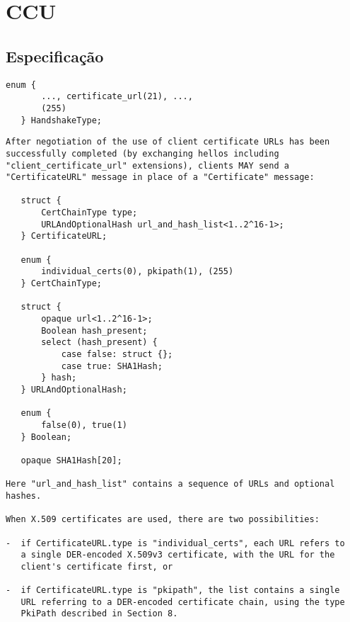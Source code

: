 
\section{\acl{CCU}}

\subsection{Especificação}

\begin{lstlisting}[caption={Definição do novo tipo de mensagem de \emph{handshake} \tlsHsCu}]
   enum {
       ..., certificate_url(21), ...,
       (255)
   } HandshakeType;
\end{lstlisting}

\begin{lstlisting}[caption={RFC 3546, trecho da seção 3.3}]
After negotiation of the use of client certificate URLs has been
successfully completed (by exchanging hellos including
"client_certificate_url" extensions), clients MAY send a
"CertificateURL" message in place of a "Certificate" message:

   struct {
       CertChainType type;
       URLAndOptionalHash url_and_hash_list<1..2^16-1>;
   } CertificateURL;

   enum {
       individual_certs(0), pkipath(1), (255)
   } CertChainType;

   struct {
       opaque url<1..2^16-1>;
       Boolean hash_present;
       select (hash_present) {
           case false: struct {};
           case true: SHA1Hash;
       } hash;
   } URLAndOptionalHash;

   enum {
       false(0), true(1)
   } Boolean;

   opaque SHA1Hash[20];

Here "url_and_hash_list" contains a sequence of URLs and optional
hashes.

When X.509 certificates are used, there are two possibilities:

-  if CertificateURL.type is "individual_certs", each URL refers to
   a single DER-encoded X.509v3 certificate, with the URL for the
   client's certificate first, or

-  if CertificateURL.type is "pkipath", the list contains a single
   URL referring to a DER-encoded certificate chain, using the type
   PkiPath described in Section 8.
\end{lstlisting}

